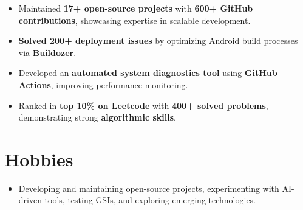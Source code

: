 \documentclass[a4paper,10pt]{article}
\begin{document}
\vspace{5pt}
\begin{itemize}
\item Maintained \textbf{17+ open-source projects} with \textbf{600+ GitHub contributions}, showcasing expertise in scalable development.\vspace{-5pt}  
\item \textbf{Solved 200+ deployment issues} by optimizing Android build processes via \textbf{Buildozer}.\vspace{-5pt}  
\item Developed an \textbf{automated system diagnostics tool} using \textbf{GitHub Actions}, improving performance monitoring.\vspace{-5pt}  
\item Ranked in \textbf{top 10\% on Leetcode} with \textbf{400+ solved problems}, demonstrating strong \textbf{algorithmic skills}.\vspace{-5pt}  


\end{itemize}
\vspace{8pt}
\section{Hobbies}

\vspace{5pt}
\begin{itemize}
\item Developing and maintaining open-source projects, experimenting with AI-driven tools, testing GSIs, and exploring emerging technologies.
\end{itemize}
\end{document}
